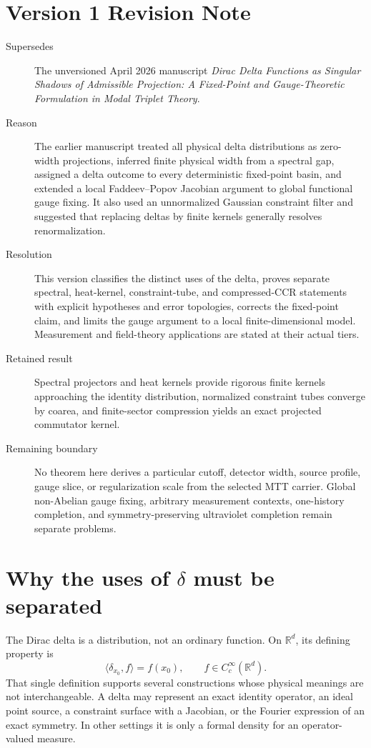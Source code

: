 \documentclass[11pt]{article}
\begin{document}
\section*{Version 1 Revision Note}
\begin{description}
\item[Supersedes] The unversioned April 2026 manuscript
\emph{Dirac Delta Functions as Singular Shadows of Admissible Projection: A
Fixed-Point and Gauge-Theoretic Formulation in Modal Triplet Theory}.
\item[Reason] The earlier manuscript treated all physical delta distributions
as zero-width projections, inferred finite physical width from a spectral gap,
assigned a delta outcome to every deterministic fixed-point basin, and
extended a local Faddeev--Popov Jacobian argument to global functional gauge
fixing. It also used an unnormalized Gaussian constraint filter and suggested
that replacing deltas by finite kernels generally resolves renormalization.
\item[Resolution] This version classifies the distinct uses of the delta,
proves separate spectral, heat-kernel, constraint-tube, and compressed-CCR
statements with explicit hypotheses and error topologies, corrects the
fixed-point claim, and limits the gauge argument to a local finite-dimensional
model. Measurement and field-theory applications are stated at their actual
tiers.
\item[Retained result] Spectral projectors and heat kernels provide rigorous
finite kernels approaching the identity distribution, normalized constraint
tubes converge by coarea, and finite-sector compression yields an exact
projected commutator kernel.
\item[Remaining boundary] No theorem here derives a particular cutoff,
detector width, source profile, gauge slice, or regularization scale from the
selected MTT carrier. Global non-Abelian gauge fixing, arbitrary measurement
contexts, one-history completion, and symmetry-preserving ultraviolet
completion remain separate problems.
\end{description}

\tableofcontents

\section{Why the uses of \texorpdfstring{\(\delta\)}{delta} must be separated}

The Dirac delta is a distribution, not an ordinary function. On
\(\mathbb R^d\), its defining property is
\[
\langle\delta_{x_0},f\rangle=f(x_0),
\qquad f\in C_c^\infty(\mathbb R^d).
\]
That single definition supports several constructions whose physical meanings
are not interchangeable. A delta may represent an exact identity operator, an
ideal point source, a constraint surface with a Jacobian, or the Fourier
expression of an exact symmetry. In other settings it is only a formal density
for an operator-valued measure.
\end{document}
